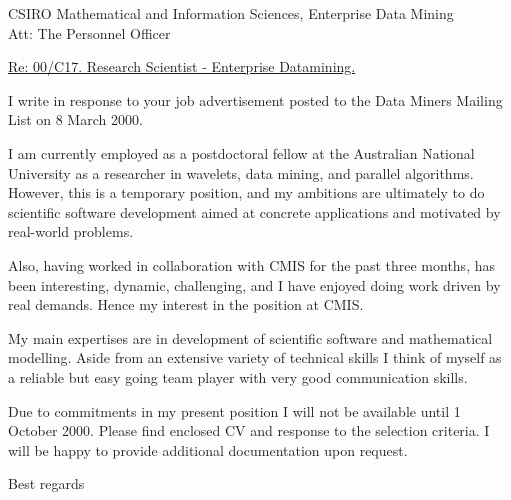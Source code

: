 \documentclass[12pt]{letter}
\begin{document}
\address{       Dr.\ Ole M{\o}ller Nielsen     \\
                Computer Sciences Laboratory, RSISE   \\
                Australian National University \\
		Canberra, ACT 0200     \\
                Ph: +61 2 6279 8627 \\
                email: Ole.Nielsen@anu.edu.au}


\signature{Ole M{\o}ller Nielsen}

\begin{letter}
{CSIRO Mathematical and Information Sciences, Enterprise Data Mining\\
 Att: The Personnel Officer}
 
\opening{\underline{Re: 00/C17. Research Scientist - Enterprise Datamining.}}

I write in response to your job advertisement posted to the Data Miners 
Mailing List on 8 March 2000.

I am currently employed as a postdoctoral fellow at the 
Australian National University as a researcher in 
wavelets, data mining, and parallel algorithms.
However, this is a temporary position, and my ambitions
are ultimately to do scientific software development
aimed at concrete applications and motivated by real-world problems.

Also, having worked in collaboration with CMIS for the past three months,
has been interesting, dynamic, challenging, and I have 
enjoyed doing work driven by real demands.
Hence my interest in the position at CMIS.

My main expertises are in development of scientific software
and mathematical modelling.
Aside from an extensive variety of technical skills 
I think of myself as a reliable but easy going team player with 
very good communication skills.

Due to commitments in my present position I will not be available
until 1 October 2000.
Please find enclosed CV and response to the selection criteria. 
I will be happy to provide additional documentation upon request.

\vspace{1cm}
\closing{Best regards}

\end{letter}
\end{document}
